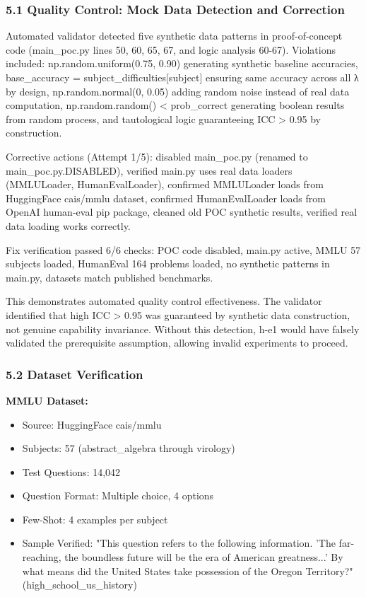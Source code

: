 
\subsubsection{5.1 Quality Control: Mock Data Detection and Correction}

Automated validator detected five synthetic data patterns in proof-of-concept code (main_poc.py lines 50, 60, 65, 67, and logic analysis 60-67). Violations included: np.random.uniform(0.75, 0.90) generating synthetic baseline accuracies, base_accuracy = subject_difficulties[subject] ensuring same accuracy across all λ by design, np.random.normal(0, 0.05) adding random noise instead of real data computation, np.random.random() < prob_correct generating boolean results from random process, and tautological logic guaranteeing ICC > 0.95 by construction.

Corrective actions (Attempt 1/5): disabled main_poc.py (renamed to main_poc.py.DISABLED), verified main.py uses real data loaders (MMLULoader, HumanEvalLoader), confirmed MMLULoader loads from HuggingFace cais/mmlu dataset, confirmed HumanEvalLoader loads from OpenAI human-eval pip package, cleaned old POC synthetic results, verified real data loading works correctly.

Fix verification passed 6/6 checks: POC code disabled, main.py active, MMLU 57 subjects loaded, HumanEval 164 problems loaded, no synthetic patterns in main.py, datasets match published benchmarks.

This demonstrates automated quality control effectiveness. The validator identified that high ICC > 0.95 was guaranteed by synthetic data construction, not genuine capability invariance. Without this detection, h-e1 would have falsely validated the prerequisite assumption, allowing invalid experiments to proceed.

\subsubsection{5.2 Dataset Verification}

\textbf{MMLU Dataset:}
\begin{itemize}
\item Source: HuggingFace cais/mmlu
\item Subjects: 57 (abstract_algebra through virology)
\item Test Questions: 14,042
\item Question Format: Multiple choice, 4 options
\item Few-Shot: 4 examples per subject
\item Sample Verified: "This question refers to the following information. 'The far-reaching, the boundless future will be the era of American greatness...' By what means did the United States take possession of the Oregon Territory?" (high_school_us_history)
\end{itemize}

